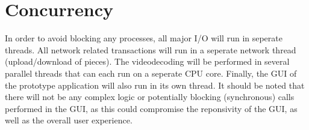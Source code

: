 \section{Concurrency}
\label{sec:conc}
In order to avoid blocking any processes, all major I/O will run in seperate threads. All network related transactions will run in a seperate network thread (upload/download of pieces). The videodecoding will be performed in several parallel threads that can each run on a seperate CPU core. Finally, the GUI of the prototype application will also run in its own thread. It should be noted that there will not be any complex logic or potentially blocking (synchronous) calls performed in the GUI, as this could compromise the reponsivity of the GUI, as well as the overall user experience.

